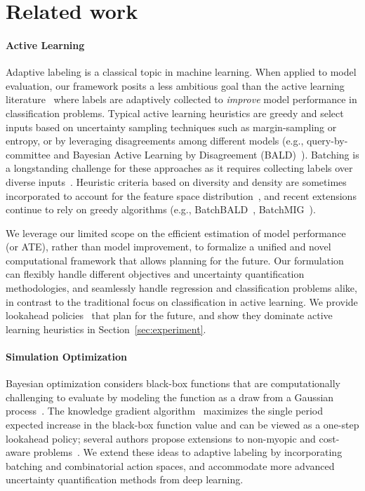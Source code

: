 \section{Related work}
\label{sec:related-work}

\paragraph{Active Learning} Adaptive labeling is a classical topic in machine learning.
When applied to model evaluation, our framework posits a less  ambitious goal than the active learning literature~\citep{AggarwalKoGuHaPh14,Settles09} where labels are adaptively collected  to \emph{improve} model performance in classification problems. Typical active learning heuristics are greedy and select inputs based on uncertainty sampling techniques such as margin-sampling or entropy, or by leveraging disagreements among different models (e.g., query-by-committee and Bayesian Active Learning by Disagreement (BALD)~\citep{HoulsbyHuGhLe11}). 
Batching is a longstanding challenge for these approaches as it requires collecting labels over diverse inputs~\citep{Settles09}. Heuristic criteria based on diversity and density are sometimes incorporated to account for the feature space distribution~\citep{Settles09},  and recent extensions continue to rely on greedy algorithms (e.g., BatchBALD~\citep{KirschVaGa19}, BatchMIG~\citep{WangSuGr21}).

We leverage our limited scope on the efficient estimation of model performance (or ATE), rather than model improvement, 
to formalize a unified and novel computational framework that allows planning for the future.
Our formulation can flexibly handle different objectives and uncertainty quantification methodologies, and seamlessly handle regression and classification problems alike, in contrast to the traditional focus on classification in active learning.
We provide lookahead policies~\citep{BertsekasTs96,EfroniDaScMa18, EfroniGhMa20} that plan for the future, and show they dominate active learning heuristics in Section~\ref{sec:experiment}.

\paragraph{Simulation Optimization}
Bayesian optimization considers black-box functions that are computationally challenging to 
evaluate by modeling the function as a draw from a Gaussian process~\citep{Frazier18}. 
The knowledge gradient algorithm~\citep{FrazierPoDa08}
maximizes the single period expected increase in the black-box function value and can be viewed as a one-step lookahead policy; several authors propose extensions to non-myopic and cost-aware problems~\citep{AstudilloJiBaBaFr21}.
We extend these ideas to adaptive labeling  by incorporating batching and combinatorial action spaces, and accommodate more advanced uncertainty quantification methods from deep learning.

